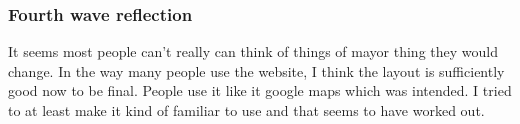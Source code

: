 \documentclass[final,a4paper,11pt]{article}
\begin{document}
\subsubsection*{Fourth wave reflection}
It seems most people can't really can think of things of mayor thing they would change. In the way many people use the website, I think the layout is sufficiently good now to be final. People use it like it google maps which was intended. I tried to at least make it kind of familiar to use and that seems to have worked out.
\end{document}
